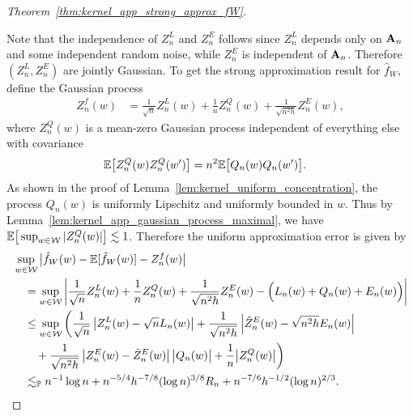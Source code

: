 \begin{proof}[Theorem~\ref{thm:kernel_app_strong_approx_fW}]
\begin{enumerate}[label=(\roman*)]
  \end{enumerate}
  Note that the independence of
  $Z_n^L$ and $Z_n^E$
  follows since $Z_n^L$
  depends only on $\mathbf{A}_n$ and some independent random noise,
  while $Z_n^E$ is independent of $\mathbf{A}_n$.
  Therefore $(Z_n^L, Z_n^E)$ are jointly Gaussian.
  To get the strong approximation result
  for $\hat f_W$,
  define the Gaussian process
  \begin{align*}
    Z_n^f(w)
    &=
    \frac{1}{\sqrt n} Z_n^L(w)
    + \frac{1}{n} Z_n^Q(w)
    + \frac{1}{\sqrt{n^2h}} Z_n^E(w),
  \end{align*}
  where $Z_n^Q(w)$ is a mean-zero Gaussian process
  independent of everything else
  with covariance
  \begin{align*}
    \mathbb{E}\big[
      Z_n^Q(w)
      Z_n^Q(w')
    \big]
    &=
    n^2 \mathbb{E}\big[
      Q_n(w)
      Q_n(w')
    \big].
  \end{align*}
  As shown in the proof of
  Lemma~\ref{lem:kernel_uniform_concentration},
  the process
  $Q_n(w)$ is uniformly Lipschitz
  and uniformly bounded in $w$.
  Thus by Lemma~\ref{lem:kernel_app_gaussian_process_maximal},
  we have
  $\mathbb{E}\big[\sup_{w \in \mathcal{W}}
  |Z_n^Q(w)|\big]
  \lesssim 1$.
  Therefore the uniform approximation error is given by
  \begin{align*}
    &
    \sup_{w \in \mathcal{W}}
    \big|
    \hat f_W(w) - \mathbb{E}[\hat f_W(w)]
    - Z_n^f(w)
    \big|
    \\
    &\quad=
    \sup_{w \in \mathcal{W}}
    \left|
    \frac{1}{\sqrt n} Z_n^L(w)
    + \frac{1}{n} Z_n^Q(w)
    + \frac{1}{\sqrt{n^2h}} Z_n^E(w)
    - \Big(
      L_n(w) + Q_n(w) + E_n(w)
    \Big)
    \right| \\
    &\quad\leq
    \sup_{w \in \mathcal{W}}
    \bigg(
      \frac{1}{\sqrt n}
      \left|
      Z_n^L(w) - \sqrt{n} L_n(w)
      \right|
      + \frac{1}{\sqrt{n^2h}}
      \left|
      \tilde Z_n^E(w) - \sqrt{n^2h} E_n(w)
      \right| \\
      &\qquad+
      \frac{1}{\sqrt{n^2h}}
      \left|
      Z_n^E(w) - \tilde Z_n^E(w)
      \right|
      \big| Q_n(w) \big|
      + \frac{1}{n}
      \big| Z_n^Q(w) \big|
    \bigg) \\
    &\quad\lesssim_{\mathbb{P}}
    n^{-1} \log n
    + n^{-5/4} h^{-7/8} (\log n)^{3/8} R_n
    + n^{-7/6} h^{-1/2} (\log n)^{2/3}.
  \end{align*}



\end{proof}
